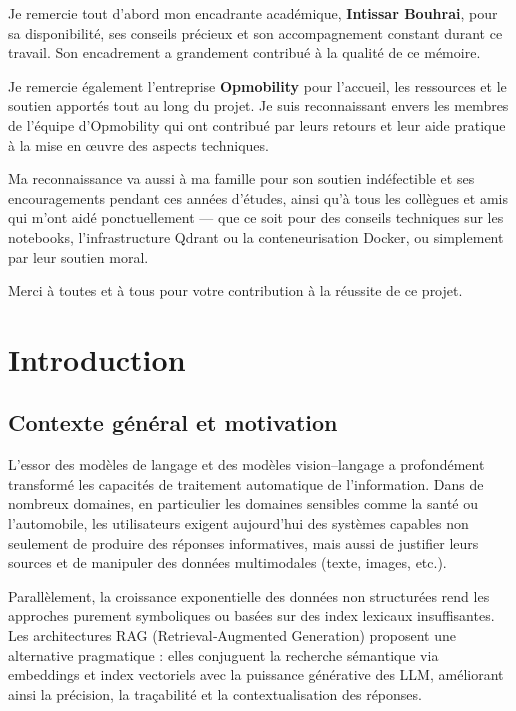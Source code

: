 \documentclass[12pt,a4paper]{report}
\begin{document}
Je remercie tout d'abord mon encadrante académique, \textbf{Intissar Bouhrai}, pour sa disponibilité, ses conseils précieux et son accompagnement constant durant ce travail. Son encadrement a grandement contribué à la qualité de ce mémoire.

Je remercie également l'entreprise \textbf{Opmobility} pour l'accueil, les ressources et le soutien apportés tout au long du projet. Je suis reconnaissant envers les membres de l'équipe d'Opmobility qui ont contribué par leurs retours et leur aide pratique à la mise en œuvre des aspects techniques.

Ma reconnaissance va aussi à ma famille pour son soutien indéfectible et ses encouragements pendant ces années d'études, ainsi qu'à tous les collègues et amis qui m'ont aidé ponctuellement — que ce soit pour des conseils techniques sur les notebooks, l'infrastructure Qdrant ou la conteneurisation Docker, ou simplement par leur soutien moral.

Merci à toutes et à tous pour votre contribution à la réussite de ce projet.

\tableofcontents
\clearpage

\chapter{Introduction}
\label{chap:introduction}

\section{Contexte général et motivation}
L'essor des modèles de langage et des modèles vision–langage a profondément transformé les capacités de traitement automatique de l'information. Dans de nombreux domaines, en particulier les domaines sensibles comme la santé ou l'automobile, les utilisateurs exigent aujourd'hui des systèmes capables non seulement de produire des réponses informatives, mais aussi de justifier leurs sources et de manipuler des données multimodales (texte, images, etc.).

Parallèlement, la croissance exponentielle des données non structurées rend les approches purement symboliques ou basées sur des index lexicaux insuffisantes. Les architectures RAG (Retrieval‑Augmented Generation) proposent une alternative pragmatique : elles conjuguent la recherche sémantique via embeddings et index vectoriels avec la puissance générative des LLM, améliorant ainsi la précision, la traçabilité et la contextualisation des réponses.
\end{document}
